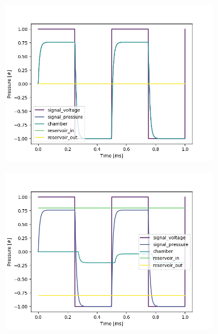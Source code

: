 \documentclass[fontsize=12pt, a4paper]{scrartcl}
\begin{document}
\begin{figure}[H]
    \centering
    \begin{subfigure}[H]{0.48\textwidth}
        \includegraphics[width=\textwidth, valign=t]{bilder/backpressure/backpressure_free.png}
    \end{subfigure}
    \begin{subfigure}[H]{0.48\textwidth}
        \includegraphics[width=\textwidth, valign=t]{bilder/backpressure/backpressure_example.png}
    \end{subfigure}
    \begin{subfigure}[H]{0.48\textwidth}

\end{subfigure}
\end{figure}
\end{document}
